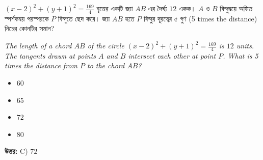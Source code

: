 \documentclass[12pt, a4paper]{article}
\begin{document}
\begin{tcolorbox}[questionbox={প্রশ্ন (Question) 46}]
    \noindent
    $(x - 2)^2 + (y + 1)^2 = \frac{169}{4}$ বৃত্তের একটি জ্যা $AB$ এর দৈর্ঘ্য $12$ একক। $A$ ও $B$ বিন্দুদ্বয়ে অঙ্কিত স্পর্শকদ্বয় পরস্পরকে $P$ বিন্দুতে ছেদ করে। জ্যা $AB$ হতে $P$ বিন্দুর দূরত্বের ৫ গুণ (5 times the distance) নিচের কোনটির সমান?
    
    \vspace{0.8em}
    \begin{english}
    \noindent\textit{\color{darkgray}
    The length of a chord $AB$ of the circle $(x - 2)^2 + (y + 1)^2 = \frac{169}{4}$ is $12$ units. The tangents drawn at points $A$ and $B$ intersect each other at point $P$. What is 5 times the distance from $P$ to the chord $AB$?
    }
    \end{english}
\end{tcolorbox}

\begin{itemize}[label={}, leftmargin=1cm, itemsep=0.5em]
    \item[\textbf{A)}] $60$
    \item[\textbf{B)}] $65$
    \item[\textbf{C)}] $72$
    \item[\textbf{D)}] $80$
\end{itemize}

\vspace{0.5em}
\begin{tcolorbox}[answerbox]
    \textbf{\color{success} উত্তর:} C) $72$
\end{tcolorbox}
\vspace{1em}
\end{document}
